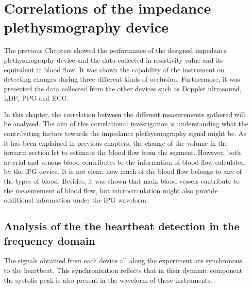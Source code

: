 
\chapter{Correlations of the impedance plethysmography device}  %
\label{chapter correlations}
\ifpdf
    \graphicspath{{Chapter9/Figs/Raster/}{Chapter9/Figs/PDF/}{Chapter9/Figs/}}
\else
    \graphicspath{{Chapter9/Figs/Vector/}{Chapter9/Figs/}}
\fi

The previous Chapters showed the performance of the designed impedance plethysmography device and the data collected in resistivity value and its equivalent in blood flow. It was shown the capability of the instrument on detecting changes during three different kinds of occlusion. Furthermore, it was presented the data collected from the other devices such as Doppler ultrasound, LDF, PPG and ECG. 

In this chapter, the correlation between the different measurements gathered will be analysed. The aim of this correlational investigation is understanding what the contributing factors towards the impedance plethysmography signal might be. As it has been explained in previous chapters, the change of the volume in the forearm section let to estimate the blood flow from the segment. However, both arterial and venous blood contributes to the information of blood flow calculated by the iPG device. It is not clear, how much of the blood flow belongs to any of the types of blood. Besides, it was shown that main blood vessels contribute to the measurement of blood flow, but microcirculation might also provide additional information under the iPG waveform. 

\section{Analysis of the the heartbeat detection in the frequency domain} %
\label{section correlation 1} 
The signals obtained from each device all along the experiment are synchronous to the heartbeat. This synchronisation reflects that in their dynamic component the systolic peak is also present in the waveform of these instruments.

